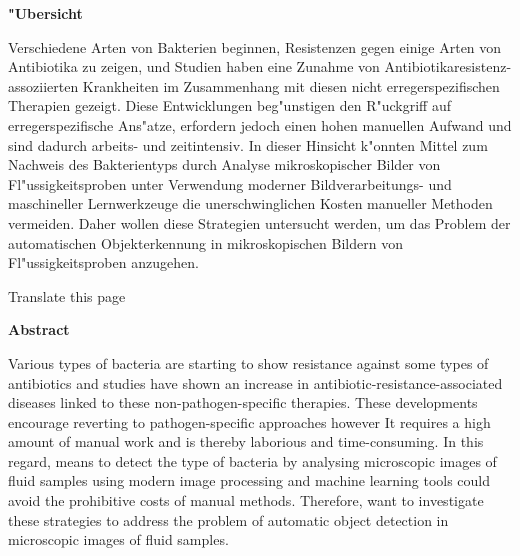 
\begin{center}
    \bfseries
    "Ubersicht
    \normalfont
\end{center}
Verschiedene Arten von Bakterien beginnen, Resistenzen gegen einige Arten von Antibiotika zu zeigen, und Studien haben eine Zunahme von Antibiotikaresistenz-assoziierten Krankheiten im Zusammenhang mit diesen nicht erregerspezifischen Therapien gezeigt.
Diese Entwicklungen beg"unstigen den R"uckgriff auf erregerspezifische Ans"atze, erfordern jedoch einen hohen manuellen Aufwand und sind dadurch arbeits- und zeitintensiv.
In dieser Hinsicht k"onnten Mittel zum Nachweis des Bakterientyps durch Analyse mikroskopischer Bilder von Fl"ussigkeitsproben unter Verwendung moderner Bildverarbeitungs- und maschineller Lernwerkzeuge die unerschwinglichen Kosten manueller Methoden vermeiden.
Daher wollen diese Strategien untersucht werden, um das Problem der automatischen Objekterkennung in mikroskopischen Bildern von Fl"ussigkeitsproben anzugehen.

Translate this page



\vspace{5.0cm}

\begin{center}
    \bfseries
    Abstract
    \normalfont

\end{center}

    Various types of bacteria are starting to show resistance against some types of antibiotics and studies have shown an increase in antibiotic-resistance-associated diseases linked to these non-pathogen-specific therapies.
    These developments encourage reverting to pathogen-specific approaches however It requires a high amount of manual work and is thereby laborious and time-consuming.
    In this regard, means to detect the type of bacteria by analysing microscopic images of fluid samples using modern image processing and machine learning tools could avoid the prohibitive costs of manual methods.
    Therefore, want to investigate these strategies to address the problem of automatic object detection in microscopic images of fluid samples.